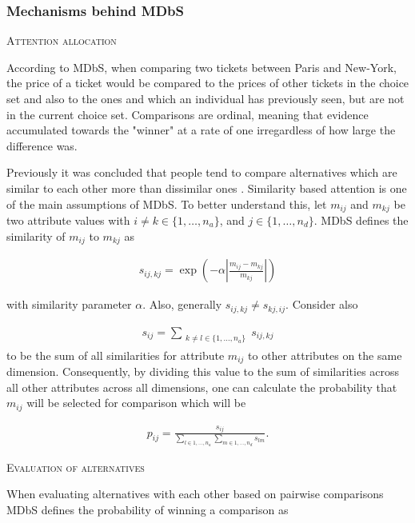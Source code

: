 \documentclass[a4paper,12pt]{article}
\begin{document}
\subsubsection{Mechanisms behind MDbS} \label{subsec:mechanismMDBS}

\textsc{Attention allocation}

According to MDbS, when comparing two tickets between Paris and New-York, the price of a ticket would be compared to the prices of other tickets in the choice set and also to the ones and which an individual has previously seen, but are not in the current choice set. Comparisons are ordinal, meaning that evidence accumulated towards the "winner" at a rate of one irregardless of how large the difference was. 

Previously it was concluded that people tend to compare alternatives which are similar to each other more than dissimilar ones \citep{noguchi2014attraction}. Similarity based attention is one of the main assumptions of MDbS. To better understand this, let $m_{ij}$ and $m_{kj}$ be two attribute values with $i \neq k \in \{1, \ldots, n_a\}$, and $j \in \{1, \ldots, n_d\}$. MDbS defines the similarity of $m_{ij}$ to $m_{kj}$ as

\begin{align}\label{similarityMDBS}
s_{ij,kj} = \exp \left( - \alpha \left| \frac{m_{ij} - m_{kj}}{m_{kj}} \right| \right) 
\end{align}

with similarity parameter $\alpha$. Also, generally $s_{ij,kj} \neq s_{kj,ij}.$ Consider also 

\begin{align}\label{sumOfSimilaritiesMDbS}
    s_{ij} = \sum_{\substack{k \neq l \in \{1, \ldots, n_a\}}} s_{ij,kj}
\end{align}
to be the sum of all similarities for attribute $m_{ij}$ to other attributes on the same dimension. Consequently, by dividing this value to the sum of similarities across all other attributes across all dimensions, one can calculate the probability that $m_{ij}$ will be selected for comparison which will be 

\begin{align}\label{probabilityOfComparison}
    p_{ij} = \frac{s_{ij}}{\sum_{l \in {1, \ldots, n_a}} \sum_{m \in {1, \ldots, n_d}} s_{lm}} .
\end{align}

\textsc{Evaluation of alternatives}

When evaluating alternatives with each other based on pairwise comparisons MDbS defines the probability of winning a comparison as 
\end{document}
